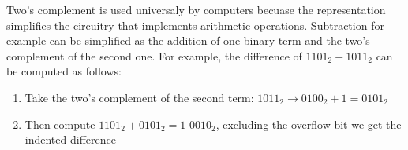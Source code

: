 Two's complement is used universaly by computers becuase the representation simplifies the 
circuitry that implements arithmetic operations. Subtraction for example can be simplified
as the addition of one binary term and the two's complement of the second one. For example,
the difference of $1101_2 - 1011_2$ can be computed as follows:

\begin{enumerate}
    \item Take the two's complement of the second term: $1011_2\rightarrow0100_2 + 1 = 0101_2$
    \item Then compute $1101_2 + 0101_2 = 1\_0010_2$, excluding the overflow bit we get the indented
    difference
\end{enumerate}